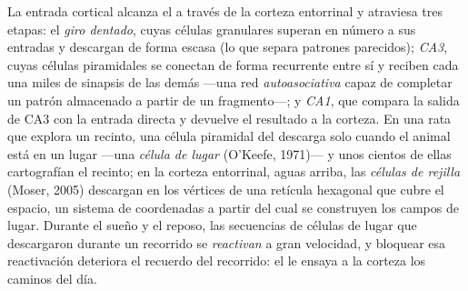 \begin{definition}\label{def:b3:learning-memory:hippocampus}
La entrada cortical alcanza el  a través de la corteza
entorrinal y atraviesa tres etapas: el \emph{giro dentado}, cuyas
células granulares superan en número a sus entradas y descargan de
forma escasa (lo que separa patrones parecidos); \emph{CA3}, cuyas
células piramidales se conectan de forma recurrente entre sí y reciben
cada una miles de sinapsis de las demás ---una red
\emph{autoasociativa} capaz de completar un patrón almacenado a partir
de un fragmento---; y \emph{CA1}, que compara la salida de CA3 con la
entrada directa y devuelve el resultado a la corteza. En una rata que
explora un recinto, una célula piramidal del  descarga solo
cuando el animal está en un lugar ---una \emph{célula de lugar}
(O'Keefe, 1971)--- y unos cientos de ellas cartografían el recinto; en
la corteza entorrinal, aguas arriba, las \emph{células de rejilla}
(Moser, 2005) descargan en los vértices de una retícula hexagonal que
cubre el espacio, un sistema de coordenadas a partir del cual se
construyen los campos de lugar. Durante el sueño y el reposo, las
secuencias de células de lugar que descargaron durante un recorrido se
\emph{reactivan} a gran velocidad, y bloquear esa reactivación
deteriora el recuerdo del recorrido: el  le ensaya a la
corteza los caminos del día.
\end{definition}

